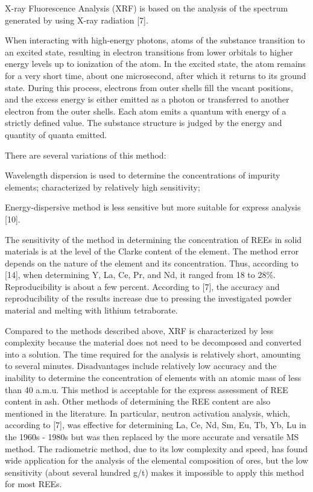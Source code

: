 \begin{multicols}{2}
X-ray Fluorescence Analysis (XRF) is based on the analysis of the
spectrum generated by using X-ray radiation {[}7{]}.

When interacting with high-energy photons, atoms of the substance
transition to an excited state, resulting in electron transitions from
lower orbitals to higher energy levels up to ionization of the atom. In
the excited state, the atom remains for a very short time, about one
microsecond, after which it returns to its ground state. During this
process, electrons from outer shells fill the vacant positions, and the
excess energy is either emitted as a photon or transferred to another
electron from the outer shells. Each atom emits a quantum with energy of
a strictly defined value. The substance structure is judged by the
energy and quantity of quanta emitted.

There are several variations of this method:

Wavelength dispersion is used to determine the concentrations of
impurity elements; characterized by relatively high sensitivity;

Energy-dispersive method is less sensitive but more suitable for express
analysis {[}10{]}.

The sensitivity of the method in determining the concentration of REEs
in solid materials is at the level of the Clarke content of the element.
The method error depends on the nature of the element and its
concentration. Thus, according to {[}14{]}, when determining Y, La, Ce,
Pr, and Nd, it ranged from 18 to 28\%. Reproducibility is about a few
percent. According to {[}7{]}, the accuracy and reproducibility of the
results increase due to pressing the investigated powder material and
melting with lithium tetraborate.

Compared to the methods described above, XRF is characterized by less
complexity because the material does not need to be decomposed and
converted into a solution. The time required for the analysis is
relatively short, amounting to several minutes. Disadvantages include
relatively low accuracy and the inability to determine the concentration
of elements with an atomic mass of less than 40 a.m.u. This method is
acceptable for the express assessment of REE content in ash. Other
methods of determining the REE content are also mentioned in the
literature. In particular, neutron activation analysis, which, according
to {[}7{]}, was effective for determining La, Ce, Nd, Sm, Eu, Tb, Yb, Lu
in the 1960s - 1980s but was then replaced by the more accurate and
versatile MS method. The radiometric method, due to its low complexity
and speed, has found wide application for the analysis of the elemental
composition of ores, but the low sensitivity (about several hundred g/t)
makes it impossible to apply this method for most REEs.
\end{multicols}

